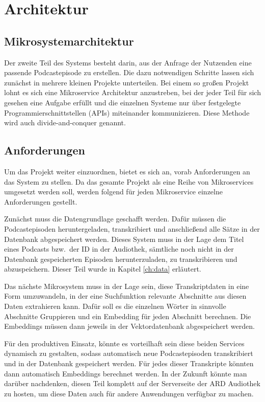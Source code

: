 \chapter{Architektur}\label{ch:method}

\section{Mikrosystemarchitektur}

Der zweite Teil des Systems besteht darin, aus der Anfrage der Nutzenden eine passende Podcastepisode zu erstellen.
Die dazu notwendigen Schritte lassen sich zunächst in mehrere kleinen Projekte unterteilen. 
Bei einem so großen Projekt lohnt es sich eine Mikroservice Architektur anzustreben, bei der jeder Teil für sich gesehen eine Aufgabe erfüllt und die einzelnen Systeme nur über festgelegte Programmierschnittstellen (APIs) miteinander kommunizieren.
Diese Methode wird auch divide-and-conquer genannt. 



\section{Anforderungen}

Um das Projekt weiter einzuordnen, bietet es sich an, vorab Anforderungen an das System zu stellen. 
Da das gesamte Projekt als eine Reihe von Mikroservices umgesetzt werden soll, werden folgend für jeden Mikroservice einzelne Anforderungen gestellt.

Zunächst muss die Datengrundlage geschafft werden. 
Dafür müssen die Podcastepisoden heruntergeladen, transkribiert und anschließend alle Sätze in der Datenbank abgespeichert werden.
Dieses System muss in der Lage dem Titel eines Podcasts bzw.\ der ID in der Audiothek, sämtliche noch nicht in der Datenbank gespeicherten Episoden herunterzuladen, zu transkribieren und abzuspeichern.
Dieser Teil wurde in Kapitel \autoref{ch:data} erläutert.

Das nächste Mikrosystem muss in der Lage sein, diese Transkriptdaten in eine Form umzuwandeln, in der eine Suchfunktion relevante Abschnitte aus diesen Daten extrahieren kann.
Dafür soll es die einzelnen Wörter in sinnvolle Abschnitte Gruppieren und ein Embedding für jeden Abschnitt berechnen.
Die Embeddings müssen dann jeweils in der Vektordatenbank abgespeichert werden.

Für den produktiven Einsatz, könnte es vorteilhaft sein diese beiden Services dynamisch zu gestalten, sodass automatisch neue Podcastepisoden transkribiert und in der Datenbank gespeichert werden.
Für jedes dieser Transkripte könnten dann automatisch Embeddings berechnet werden.
In der Zukunft könnte man darüber nachdenken, diesen Teil komplett auf der Serverseite der ARD Audiothek zu hosten, um diese Daten auch für andere Anwendungen verfügbar zu machen.



